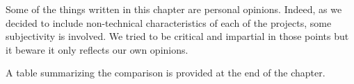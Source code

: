 Some of the things written in this chapter are personal opinions.
Indeed, as we decided to include non-technical characteristics of each of the projects, some subjectivity is involved.
We tried to be critical and impartial in those points but it beware it only reflects our own opinions.


A table summarizing the comparison is provided at the end of the chapter.





